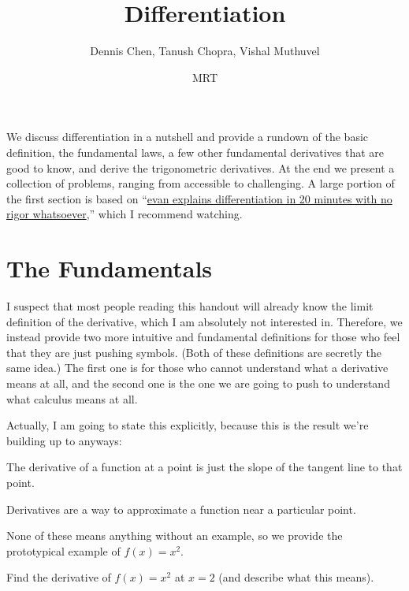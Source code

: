 \documentclass{article}
\title{Differentiation}
\author{Dennis Chen, Tanush Chopra, Vishal Muthuvel}
\date{MRT}
\begin{document}
\maketitle

We discuss differentiation in a nutshell and provide a rundown of the basic definition, the fundamental laws, a few other fundamental derivatives that are good to know, and derive the trigonometric derivatives. At the end we present a collection of problems, ranging from accessible to challenging. A large portion of the first section is based on ``\href{https://www.youtube.com/watch?v=rTyXHyu8_pA}{evan explains differentiation in 20 minutes with no rigor whatsoever},'' which I recommend watching.

\section{The Fundamentals}
I suspect that most people reading this handout will already know the limit definition of the derivative, which I am absolutely not interested in. Therefore, we instead provide two more intuitive and fundamental definitions for those who feel that they are just pushing symbols. (Both of these definitions are secretly the same idea.) The first one is for those who cannot understand what a derivative means at all, and the second one is the one we are going to push to understand what calculus means at all.

Actually, I am going to state this explicitly, because this is the result we're building up to anyways: 

\begin{defi}
The derivative of a function at a point is just the slope of the tangent line to that point.
\end{defi}

\begin{defi}
Derivatives are a way to approximate a function near a particular point.
\end{defi}

None of these means anything without an example, so we provide the prototypical example of $f(x)=x^2.$

\begin{exam}
Find the derivative of $f(x)=x^2$ at $x=2$ (and describe what this means).

\begin{center}
\end{center}
\end{exam}
\end{document}
